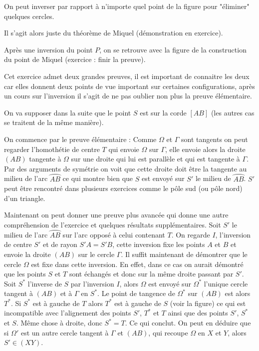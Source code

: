 \begin{sol}
On peut inverser par rapport à n'importe quel point de la figure pour "éliminer" quelques cercles.


Il s'agit alors juste du théorème de Miquel (démonstration en exercice).
\end{sol}

\begin{sol}
Après une inversion du point $P$, on se retrouve avec la figure de la construction du point de Miquel (exercice : finir la preuve).
\end{sol}

\begin{sol}
Cet exercice admet deux grandes preuves, il est important de connaitre les deux car elles donnent deux points de vue important sur certaines configurations, après un cours sur l'inversion il s'agit de ne pas oublier non plus la preuve élémentaire.

On va supposer dans la suite que le point $S$ est sur la corde $[AB]$ (les autres cas se traitent de la même manière).

On commence par le preuve élémentaire : Comme $\Omega$ et $\Gamma$ sont tangents on peut regarder l'homothétie de centre $T$ qui envoie $\Omega$ sur $\Gamma$, elle envoie alors la droite $(AB)$ tangente à $\Omega$ sur une droite qui lui est parallèle et qui est tangente à $\Gamma$. Par des arguments de symétrie on voit que cette droite doit être la tangente au milieu de l'arc $\wideparen{AB}$ ce qui montre bien que $S$ est envoyé sur $S'$ le milieu de $\wideparen{AB}$. $S'$ peut être rencontré dans plusieurs exercices comme le pôle sud (ou pôle nord) d'un triangle.

Maintenant on peut donner une preuve plus avancée qui donne une autre compréhension de l'exercice et quelques résultats supplémentaires. Soit $S'$ le milieu de l'arc $\wideparen{AB}$ sur l'arc opposé à celui contenant $T$. On regarde $I$, l'inversion de centre $S'$ et de rayon $S'A=S'B$, cette inversion fixe les points $A$ et $B$ et envoie la droite $(AB)$ sur le cercle $\Gamma$. Il suffit maintenant de démontrer que le cercle $\Omega$ est fixe dans cette inversion. En effet, dans ce cas on aurait démontré que les points $S$ et $T$ sont échangés et donc sur la même droite passant par $S'$. Soit $S^*$ l'inverse de $S$ par l'inversion $I$, alors $\Omega$ est envoyé sur $\Omega^*$ l'unique cercle tangent à $(AB)$ et à $\Gamma$ en $S^*$. Le point de tangence de $\Omega^*$ sur $(AB)$ est alors $T^*$. Si $S^*$ est à gauche de $T$ alors $T^*$ est à gauche de $S$ (voir la figure) ce qui est incompatible avec l'alignement des points $S'$, $T^*$ et $T$ ainsi que des points $S'$, $S^*$ et $S$. Même chose à droite, donc $S^*=T$. Ce qui conclut. On peut en déduire que si $\Omega'$ est un autre cercle tangent à $\Gamma$ et $(AB)$, qui recoupe $\Omega$ en $X$ et $Y$, alors $S' \in (XY)$.
\end{sol}


